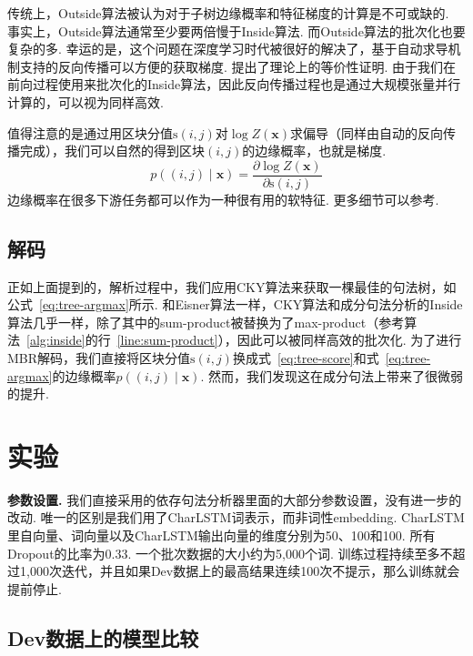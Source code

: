 传统上，Outside算法被认为对于子树边缘概率和特征梯度的计算是不可或缺的.
事实上，Outside算法通常至少要两倍慢于Inside算法.
而Outside算法的批次化也要复杂的多.
幸运的是，这个问题在深度学习时代被很好的解决了，基于自动求导机制支持的反向传播可以方便的获取梯度.
\citet{eisner-2016-inside}提出了理论上的等价性证明.
由于我们在前向过程使用来批次化的Inside算法，因此反向传播过程也是通过大规模张量并行计算的，可以视为同样高效.

值得注意的是通过用区块分值$\mathrm{s}(i,j)$对$\log Z(\boldsymbol{x})$求偏导（同样由自动的反向传播完成），我们可以自然的得到区块$(i,j)$的边缘概率，也就是梯度.
\begin{equation} \label{eq:con-partial-derivative}
  p((i, j)\mid\boldsymbol{x}) = \frac{\partial \log Z(\boldsymbol{x})}{\partial \mathrm{s}(i, j)}
\end{equation}
边缘概率在很多下游任务都可以作为一种很有用的软特征.
更多细节可以参考\citet{eisner-2016-inside}.

\subsection{解码}

正如上面提到的，解析过程中，我们应用CKY算法来获取一棵最佳的句法树，如公式~\ref{eq:tree-argmax}所示.
和Eisner算法一样，CKY算法和成分句法分析的Inside算法几乎一样，除了其中的sum-product被替换为了max-product（参考算法~\ref{alg:inside}的行~\ref{line:sum-product}），因此可以被同样高效的批次化.
为了进行MBR解码，我们直接将区块分值$\mathrm{s}(i,j)$换成式~\ref{eq:tree-score}和式~\ref{eq:tree-argmax}的边缘概率$p((i,j)\mid\boldsymbol{x})$.
然而，我们发现这在成分句法上带来了很微弱的提升.

\section{实验}
\label{sec:con-experiments}

\noindent\textbf{参数设置.}
我们直接采用\citep{dozat-etal-2017-biaffine}的依存句法分析器里面的大部分参数设置，没有进一步的改动.
唯一的区别是我们用了CharLSTM词表示，而非词性embedding.
CharLSTM里自向量、词向量以及CharLSTM输出向量的维度分别为50、100和100.
所有Dropout的比率为0.33.
一个批次数据的大小约为5,000个词.
训练过程持续至多不超过1,000次迭代，并且如果Dev数据上的最高结果连续100次不提示，那么训练就会提前停止.



\subsection{Dev数据上的模型比较}

